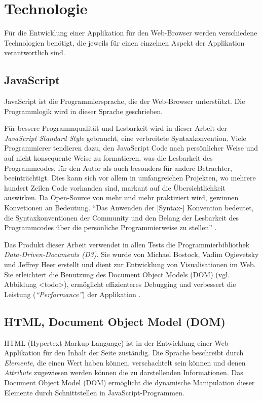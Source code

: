 \section{Technologie}

Für die Entwicklung einer Applikation für den Web-Browser werden verschiedene Technologien benötigt, die jeweils für einen einzelnen Aspekt der Applikation verantwortlich sind.

\subsection{JavaScript}

JavaScript ist die Programmiersprache, die der Web-Browser unterstützt. Die Programmlogik wird in dieser Sprache geschrieben.

Für bessere Programmqualität und Lesbarkeit wird in dieser Arbeit der \textit{JavaScript Standard Style} gebraucht, eine verbreitete Syntaxkonvention. Viele Programmierer tendieren dazu, den JavaScript Code nach persönlicher Weise und auf nicht konsequente Weise zu formatieren, was die Lesbarkeit des Programmcodes, für den Autor als auch besonders für andere Betrachter, beeinträchtigt. Dies kann sich vor allem in umfangreichen Projekten, wo mehrere hundert Zeilen Code vorhanden sind, markant auf die Übersichtlichkeit auswirken. Da Open-Source von mehr und mehr praktiziert wird, gewinnen Konvetionen an Bedeutung. "`Das Anwenden der [Syntax-] Konvention bedeutet, die Syntaxkonventionen der Community und den Belang der Lesbarkeit des Programmcodes über die persönliche Programmierweise zu stellen"' \cite{feross}.

Das Produkt dieser Arbeit verwendet in allen Tests die Programmierbibliothek \textit{Data-Driven-Documents (D3)}. Sie wurde von Michael Bostock, Vadim Ogievetsky und Jeffrey Heer erstellt und dient zur Entwicklung von Visualisationen im Web. Sie erleichtert die Benutzung des Document Object Models (DOM) (vgl. Abbildung <todo>), ermöglicht effizienteres Debugging und verbessert die Leistung (\textit{"`Performance"'}) der Applikation \cite{bostock}.

\subsection{HTML, Document Object Model (DOM)}

HTML (Hypertext Markup Language) ist in der Entwicklung einer Web-Applikation für den Inhalt der Seite zuständig. Die Sprache beschreibt durch \textit{Elemente}, die einen Wert haben können, verschachtelt sein können und denen \textit{Attribute} zugewiesen werden können die zu darstellenden Informationen. Das Document Object Model (DOM) ermöglicht die dynamische Manipulation dieser Elemente durch Schnittstellen in JavaScript-Programmen.

